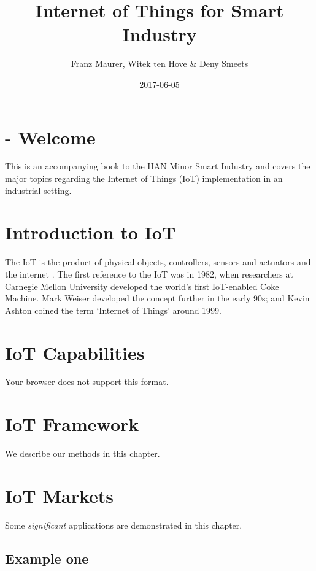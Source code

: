 \documentclass[]{book}
\title{Internet of Things for Smart Industry}
\author{Franz Maurer, Witek ten Hove \& Deny Smeets}
\date{2017-06-05}
\theoremstyle{definition}
\theoremstyle{definition}
\theoremstyle{remark}
\begin{document}
\maketitle

{
\setcounter{tocdepth}{1}
\tableofcontents
}
\chapter{- Welcome}\label{welcome}

This is an accompanying book to the HAN Minor Smart Industry and covers
the major topics regarding the Internet of Things (IoT) implementation
in an industrial setting.

\chapter{Introduction to IoT}\label{intro}

The IoT is the product of physical objects, controllers, sensors and
actuators and the internet \citep{mcewen_designing_2013}. The first
reference to the IoT was in 1982, when researchers at Carnegie Mellon
University developed the world's first IoT-enabled Coke Machine. Mark
Weiser developed the concept further in the early 90s; and Kevin Ashton
coined the term `Internet of Things' around 1999.

\chapter{IoT Capabilities}\label{capabilities}

 Your browser does not support this format.

\chapter{IoT Framework}\label{framework}

We describe our methods in this chapter.

\chapter{IoT Markets}\label{markets}

Some \emph{significant} applications are demonstrated in this chapter.

\section{Example one}\label{example-one}
\end{document}
